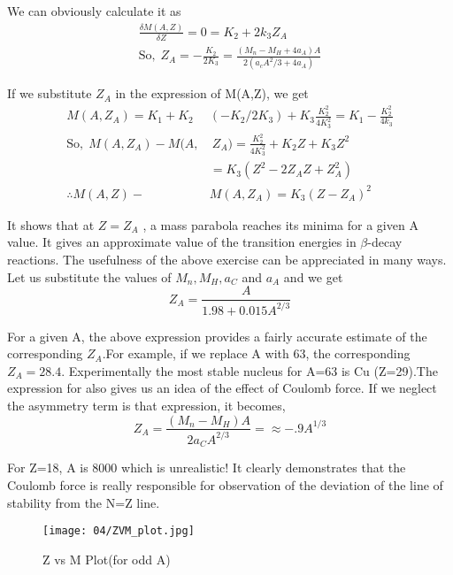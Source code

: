      We can obviously calculate it as 
\begin{align}
\frac{\delta M(A,Z)}{\delta Z}=0=K_2+2k_3Z_A\\
\textrm{So,}
~~Z_A= -\frac{K_2}{2K_3}=\frac{(M_n-M_H+4a_A)A}{2(a_cA^2/3+4a_A)}
\end{align}
     
If we substitute $Z_A$ in the expression of M(A,Z), we get 
\begin{equation}
 \begin{split}
 M(A,Z_A)=K_1+K_2&(-K_2/2K_3)+K_3\frac{K_2^2}{4K_3^2}=K_1-\frac{K_2^2}{4k_3}\\
\textrm{So,}~~M(A,Z_A)-M(A,&~Z_A)=\frac{K_2^2}{4K_3^2}+K_2Z+K_3Z^2\\&=K_3(Z^2-2Z_AZ+Z_A^2)\\
\therefore M(A,Z)-&M(A,Z_A)=K_3(Z-Z_A)^2 
\end{split}  
\end{equation} 

   
It shows that at $Z=Z_A$ , a mass parabola reaches its minima for a given A value. It gives an approximate value of the transition energies in $\beta$-decay reactions. The usefulness of the above exercise can be appreciated in many ways. Let us substitute the values of $M_n, M_H, a_C $ and $a_A $ and we get
  \begin{equation}
  Z_A=\frac{A}{1.98+0.015A^{2/3}}
   \end{equation}
   
  For a given A, the above expression provides a fairly accurate estimate of the corresponding $Z_A$.For example, if we replace A with 63, the corresponding $Z_A = 28.4$. Experimentally the most stable nucleus for A=63 is Cu (Z=29).The expression for also gives us an idea of the effect of Coulomb force. If we neglect the asymmetry term is that expression, it becomes,
  \begin{equation}
  Z_A=\frac{(M_n-M_H)A}{2a_CA^{2/3}}=\approx-.9A^{1/3}
      \end{equation}

For Z=18, A is 8000 which is unrealistic! It clearly demonstrates that the Coulomb force is really responsible for observation of the deviation of the line of stability from the N=Z line.

\begin{wrapfigure}{l}{0.5\textwidth}
         \texttt{[image: 04/ZVM\_plot.jpg]}
         \caption{Z vs M Plot(for odd A)}
         \label{fig:plot_ZvsM}
\end{wrapfigure}
     
